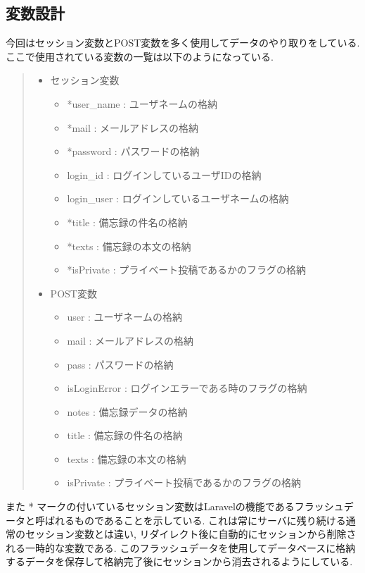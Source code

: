 \documentclass[submit,techrep]{ipsj}
\begin{document}
\subsection{変数設計}

今回はセッション変数とPOST変数を多く使用してデータのやり取りをしている. ここで使用されている変数の一覧は以下のようになっている. 

\begin{quote}
 \begin{itemize}
  \item セッション変数
   \begin{itemize}
    \item *user\_name : ユーザネームの格納
    \item *mail : メールアドレスの格納
    \item *password : パスワードの格納
    \item login\_id : ログインしているユーザIDの格納
    \item login\_user : ログインしているユーザネームの格納
    \item *title : 備忘録の件名の格納
    \item *texts : 備忘録の本文の格納
    \item *isPrivate : プライベート投稿であるかのフラグの格納
   \end{itemize}
  \item POST変数
   \begin{itemize}
    \item user : ユーザネームの格納
    \item mail : メールアドレスの格納
    \item pass : パスワードの格納
    \item isLoginError : ログインエラーである時のフラグの格納
    \item notes : 備忘録データの格納
    \item title : 備忘録の件名の格納
    \item texts : 備忘録の本文の格納
    \item isPrivate : プライベート投稿であるかのフラグの格納
   \end{itemize}
 \end{itemize}
\end{quote}

また * マークの付いているセッション変数はLaravelの機能であるフラッシュデータと呼ばれるものであることを示している. これは常にサーバに残り続ける通常のセッション変数とは違い, リダイレクト後に自動的にセッションから削除される一時的な変数である. 
このフラッシュデータを使用してデータベースに格納するデータを保存して格納完了後にセッションから消去されるようにしている. 
\end{document}
